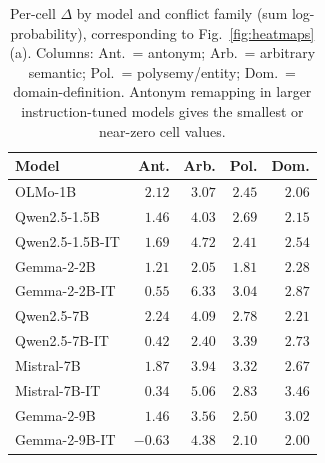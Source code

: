 \documentclass[11pt]{article}
\newcommand{\effect}{\ensuremath{\Delta}\xspace}
\begin{document}
\begin{table}[H]
\centering
\scriptsize
\setlength{\tabcolsep}{2pt}
\begin{tabular*}{\columnwidth}{@{\extracolsep{\fill}}lrrrr@{}}
\toprule
Model & Ant. & Arb. & Pol. & Dom. \\
\midrule
OLMo-1B           & $2.12$ & $3.07$ & $2.45$ & $2.06$ \\
Qwen2.5-1.5B      & $1.46$ & $4.03$ & $2.69$ & $2.15$ \\
Qwen2.5-1.5B-IT   & $1.69$ & $4.72$ & $2.41$ & $2.54$ \\
Gemma-2-2B        & $1.21$ & $2.05$ & $1.81$ & $2.28$ \\
Gemma-2-2B-IT     & $0.55$ & $6.33$ & $3.04$ & $2.87$ \\
Qwen2.5-7B        & $2.24$ & $4.09$ & $2.78$ & $2.21$ \\
Qwen2.5-7B-IT     & $0.42$ & $2.40$ & $3.39$ & $2.73$ \\
Mistral-7B        & $1.87$ & $3.94$ & $3.32$ & $2.67$ \\
Mistral-7B-IT     & $0.34$ & $5.06$ & $2.83$ & $3.46$ \\
Gemma-2-9B        & $1.46$ & $3.56$ & $2.50$ & $3.02$ \\
Gemma-2-9B-IT     & $-0.63$ & $4.38$ & $2.10$ & $2.00$ \\
\bottomrule
\end{tabular*}
\caption{Per-cell $\effect$ by model and conflict family (sum log-probability), corresponding to
Fig.~\ref{fig:heatmaps}(a). Columns: Ant.\ = antonym; Arb.\ = arbitrary semantic;
Pol.\ = polysemy/entity; Dom.\ = domain-definition. Antonym remapping in larger
instruction-tuned models gives the smallest or near-zero cell values.}
\label{tab:model_x_family}
\end{table}
\end{document}
